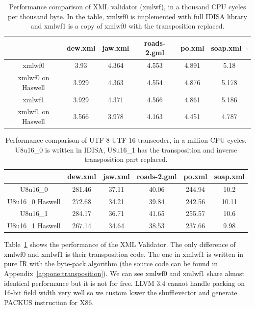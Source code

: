 \begin{table}[h]
\centering
\begin{tabular}{|c|c|c|c|c|c|}
\hline
        & dew.xml  &  jaw.xml  &  roads-2.gml  &  po.xml  & soap.xml¬ \\\hline
xmlwf0   &  3.93   &    4.364   &   4.553   &   4.891   &   5.18 \\ \hline
xmlwf0 on Haswell   &  3.929   &   4.363   &   4.554   &   4.876   &   5.178 \\ \hline

xmlwf1   &  3.929   &   4.371   &   4.566   &   4.861   &   5.186 \\ \hline
xmlwf1 on Haswell &   3.566   &   3.978   &   4.163   &   4.451   &   4.787 \\ \hline
\end{tabular}
\caption[Performance comparison of XML Validator (xmlwf)]{Performance comparison of XML validator (xmlwf), in a thousand CPU cycles per thousand byte. In the table, xmlwf0 is implemented with full IDISA library and xmlwf1 is a copy of xmlwf0 with the transposition replaced.}
\label{table:xmlwf_perf}
\end{table}

\begin{table}[h]
\centering
\begin{tabular}{|c|c|c|c|c|c|}
\hline
 & dew.xml & jaw.xml & roads-2.gml & po.xml & soap.xml \\ \hline
 U8u16\_0         & 281.46  & 37.11   & 40.06       & 244.94 & 10.2     \\ \hline
 U8u16\_0 Haswell & 272.68  & 34.21   & 39.84       & 242.56 & 10.11    \\ \hline
 U8u16\_1         & 284.17  & 36.71   & 41.65       & 255.57 & 10.6     \\ \hline
 U8u16\_1 Haswell & 267.14  & 34.64   & 38.53       & 237.66 & 9.98     \\ \hline
 \end{tabular}
 \caption[Performance comparison of UTF-8 UTF-16 Transcoder]{Performance comparison of UTF-8 UTF-16 transcoder, in a million CPU cycles. U8u16\_0 is written in IDISA, U8u16\_1 has the transposition and inverse transposition part replaced.}
 \label{table:u8u16_perf}
 \end{table}

Table~\ref{table:xmlwf_perf} shows the performance of the XML Validator. The only difference of xmlwf0 and xmlwf1 is their transposition code. The one in xmlwf1 is written in pure IR with the byte-pack algorithm (the source code can be found in Appendix~\ref{appone:transposition}). We can see xmlwf0 and xmlwf1 share almost identical performance but it is not for free. LLVM 3.4 cannot handle packing on 16-bit field width very well so we custom lower the shufflevector and generate PACKUS instruction for X86.

